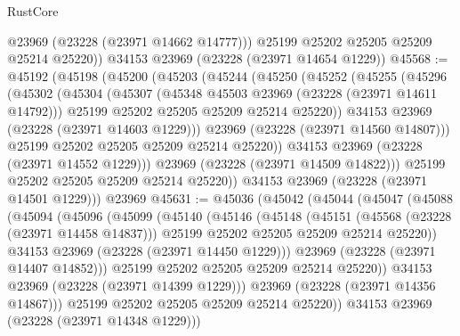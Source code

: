 \begin{lexlean}{RustCore}
\begin{coremodule}
          @23969
          (@23228 (@23971 @14662 @14777)))
        @25199
        @25202
        @25205
        @25209
        @25214
        @25220))
    @34153
    @23969
    (@23228 (@23971 @14654 @1229))
@45568 := @45192
    (@45198
      (@45200
        (@45203
          (@45244
            (@45250
              (@45252
                (@45255
                  (@45296
                    (@45302
                      (@45304
                        (@45307
                          (@45348 @45503 @23969 (@23228 (@23971 @14611 @14792)))
                          @25199
                          @25202
                          @25205
                          @25209
                          @25214
                          @25220))
                      @34153
                      @23969
                      (@23228 (@23971 @14603 @1229)))
                    @23969
                    (@23228 (@23971 @14560 @14807)))
                  @25199
                  @25202
                  @25205
                  @25209
                  @25214
                  @25220))
              @34153
              @23969
              (@23228 (@23971 @14552 @1229)))
            @23969
            (@23228 (@23971 @14509 @14822)))
          @25199
          @25202
          @25205
          @25209
          @25214
          @25220))
      @34153
      @23969
      (@23228 (@23971 @14501 @1229)))
    @23969
@45631 := @45036
    (@45042
      (@45044
        (@45047
          (@45088
            (@45094
              (@45096
                (@45099
                  (@45140
                    (@45146
                      (@45148
                        (@45151
                          (@45568 (@23228 (@23971 @14458 @14837)))
                          @25199
                          @25202
                          @25205
                          @25209
                          @25214
                          @25220))
                      @34153
                      @23969
                      (@23228 (@23971 @14450 @1229)))
                    @23969
                    (@23228 (@23971 @14407 @14852)))
                  @25199
                  @25202
                  @25205
                  @25209
                  @25214
                  @25220))
              @34153
              @23969
              (@23228 (@23971 @14399 @1229)))
            @23969
            (@23228 (@23971 @14356 @14867)))
          @25199
          @25202
          @25205
          @25209
          @25214
          @25220))
      @34153
      @23969
      (@23228 (@23971 @14348 @1229)))

\end{coremodule}
\end{lexlean}
